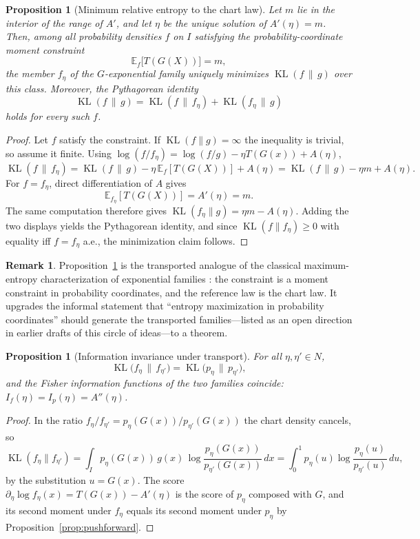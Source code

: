 \documentclass[11pt]{article}
\newtheorem{proposition}[theorem]{Proposition}
\theoremstyle{definition}
\newtheorem{remark}[theorem]{Remark}
\newcommand{\E}{\mathbb{E}}
\newcommand{\KL}{\operatorname{KL}}
\begin{document}
\begin{proposition}[Minimum relative entropy to the chart law]
\label{prop:maxent}
Let $m$ lie in the interior of the range of $A'$, and let $\eta$ be the
unique solution of $A'(\eta)=m$. Then, among all probability densities $f$
on $I$ satisfying the probability-coordinate moment constraint
\[
\E_f\bigl[T(G(X))\bigr]=m,
\]
the member $f_\eta$ of the $G$-exponential family uniquely minimizes
$\KL(f\,\|\,g)$ over this class. Moreover, the Pythagorean identity
\[
\KL(f\,\|\,g)=\KL(f\,\|\,f_\eta)+\KL(f_\eta\,\|\,g)
\]
holds for every such $f$.
\end{proposition}

\begin{proof}
Let $f$ satisfy the constraint. If $\KL(f\|g)=\infty$ the inequality is
trivial, so assume it finite. Using
$\log(f/f_\eta)=\log(f/g)-\eta T(G(x))+A(\eta)$,
\[
\KL(f\,\|\,f_\eta)
=\KL(f\,\|\,g)-\eta\,\E_f[T(G(X))]+A(\eta)
=\KL(f\,\|\,g)-\eta m+A(\eta).
\]
For $f=f_\eta$, direct differentiation of $A$ gives
\[
\E_{f_\eta}[T(G(X))]=A'(\eta)=m.
\]
The same computation therefore gives
$\KL(f_\eta\|g)=\eta m-A(\eta)$. Adding the two displays yields the
Pythagorean identity, and since $\KL(f\|f_\eta)\ge0$ with equality iff
$f=f_\eta$ a.e., the minimization claim follows.
\end{proof}

\begin{remark}
Proposition~\ref{prop:maxent} is the transported analogue of the classical
maximum-entropy characterization of exponential families
\cite{CoverThomas2006}: the constraint is a moment constraint in
probability coordinates, and the reference law is the chart law. It
upgrades the informal statement that ``entropy maximization in probability
coordinates'' should generate the transported families---listed as an open
direction in earlier drafts of this circle of ideas---to a theorem.
\end{remark}

\begin{proposition}[Information invariance under transport]
\label{prop:invariance}
For all $\eta,\eta'\in N$,
\[
\KL\bigl(f_\eta\,\|\,f_{\eta'}\bigr)
=\KL\bigl(p_\eta\,\|\,p_{\eta'}\bigr),
\]
and the Fisher information functions of the two families coincide:
$I_f(\eta)=I_p(\eta)=A''(\eta)$.
\end{proposition}

\begin{proof}
In the ratio $f_\eta/f_{\eta'}=p_\eta(G(x))/p_{\eta'}(G(x))$ the chart
density cancels, so
\[
\KL(f_\eta\|f_{\eta'})
=\int_I p_\eta(G(x))\,g(x)\,
\log\frac{p_\eta(G(x))}{p_{\eta'}(G(x))}\,dx
=\int_0^1 p_\eta(u)\log\frac{p_\eta(u)}{p_{\eta'}(u)}\,du,
\]
by the substitution $u=G(x)$. The score
$\partial_\eta\log f_\eta(x)=T(G(x))-A'(\eta)$ is the score of $p_\eta$
composed with $G$, and its second moment under $f_\eta$ equals its second
moment under $p_\eta$ by Proposition~\ref{prop:pushforward}.
\end{proof}
\end{document}
